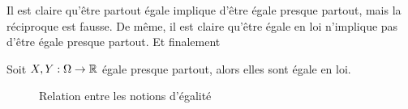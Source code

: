\begin{remarque}
	Il est claire qu'être partout égale implique d'être égale presque partout, mais la réciproque est fausse. De même, il est claire qu'être égale en loi n'implique pas d'être égale presque partout. Et finalement
\end{remarque}

\begin{theoreme}
	Soit $X,Y : \Omega \to \mathbb{R}$ égale presque partout, alors elles sont égale en loi.
\end{theoreme}
\begin{figure}[H]
	\centering
	\caption{Relation entre les notions d'égalité}
\end{figure}